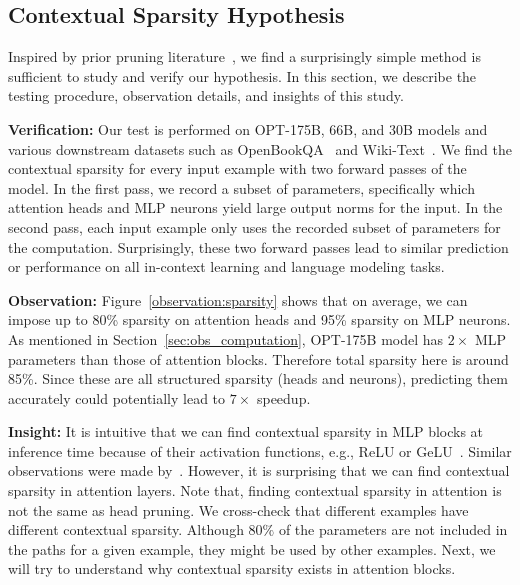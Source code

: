\subsection{Contextual Sparsity Hypothesis}
\label{sec:sparse_obs}
Inspired by prior pruning literature~\cite{molchanov2016pruning}, we find a surprisingly simple method is sufficient to study and verify our hypothesis. In this section, we describe the testing procedure, observation details, and insights of this study.   

\textbf{Verification:} Our test is performed on OPT-175B, 66B, and 30B models and various downstream datasets such as OpenBookQA~\cite{OpenBookQA2018} and Wiki-Text~\cite{merity2016pointer}. We find the contextual sparsity for every input example with two forward passes of the model. In the first pass, we record a subset of parameters, specifically which attention heads and MLP neurons yield large output norms for the input. In the second pass, each input example only uses the recorded subset of parameters for the computation. Surprisingly, these two forward passes lead to similar prediction or performance on all in-context learning and language modeling tasks.

\textbf{Observation:}  Figure~\ref{observation:sparsity} shows that on average, we can impose up to 80\% sparsity on attention heads and 95\% sparsity on MLP neurons. As mentioned in Section~\ref{sec:obs_computation}, OPT-175B model has $2\times$ MLP parameters than those of attention blocks. Therefore total sparsity here is around 85\%. Since these are all structured sparsity (heads and neurons), predicting them accurately could potentially lead to $7 \times$ speedup.   

\textbf{Insight:} It is intuitive that we can find contextual sparsity in MLP blocks at inference time because of their activation functions, e.g., ReLU or GeLU~\cite{pmlr-v119-kurtz20a}. Similar observations were made by~\cite{sanjiv}. However, it is surprising that we can find contextual sparsity in attention layers. Note that, finding contextual sparsity in attention is not the same as head pruning. We cross-check that different examples have different contextual sparsity. Although $80\%$ of the parameters are not included in the paths for a given example, they might be used by other examples. Next, we will try to understand why contextual sparsity exists in attention blocks.

